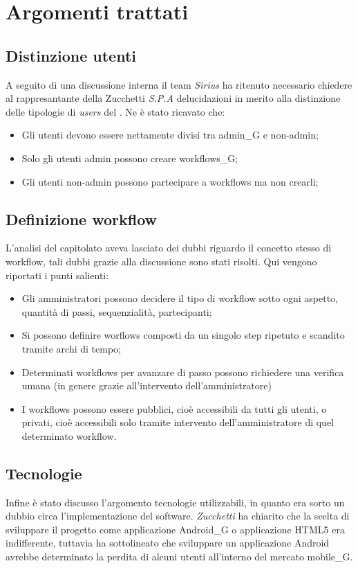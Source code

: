 \section{Argomenti trattati}
\subsection{Distinzione utenti}
A seguito di una discussione interna il team \emph{Sirius }ha ritenuto necessario chiedere al rappresantante della Zucchetti \textit{S.P.A} delucidazioni in merito alla distinzione delle tipologie di \emph{users }del \progetto.
Ne è stato ricavato che:
\begin{itemize}
\item Gli utenti devono essere nettamente divisi tra admin_G e non-admin;
\item Solo gli utenti admin possono creare workflows_G;
\item Gli utenti non-admin possono partecipare a workflows ma non crearli;
\end{itemize}

\subsection{Definizione workflow}
L'analisi del capitolato aveva lasciato dei dubbi riguardo il concetto stesso di workflow, tali dubbi grazie alla discussione sono stati risolti.
Qui vengono riportati i punti salienti:

\begin{itemize}
\item Gli amministratori possono decidere il tipo di workflow sotto ogni aspetto, quantità di passi, sequenzialità, partecipanti;
\item Si possono definire worflows composti da un singolo step ripetuto e scandito tramite archi di tempo;
\item Determinati workflows per avanzare di passo possono richiedere una verifica umana (in genere grazie all'intervento dell'amministratore)
\item I workflows possono essere pubblici, cioè accessibili da tutti gli utenti, o privati, cioè accessibili solo tramite intervento dell'amministratore di quel determinato workflow.
\end{itemize}

\subsection{Tecnologie}
Infine è stato discusso l'argomento tecnologie utilizzabili, in quanto era sorto un dubbio circa l'implementazione del software.
\textit{Zucchetti} ha chiarito che la scelta di sviluppare il progetto come applicazione Android_G o applicazione HTML5 era indifferente, tuttavia ha sottolineato che sviluppare un applicazione Android avrebbe determinato la perdita di alcuni utenti all'interno del mercato mobile_G.

